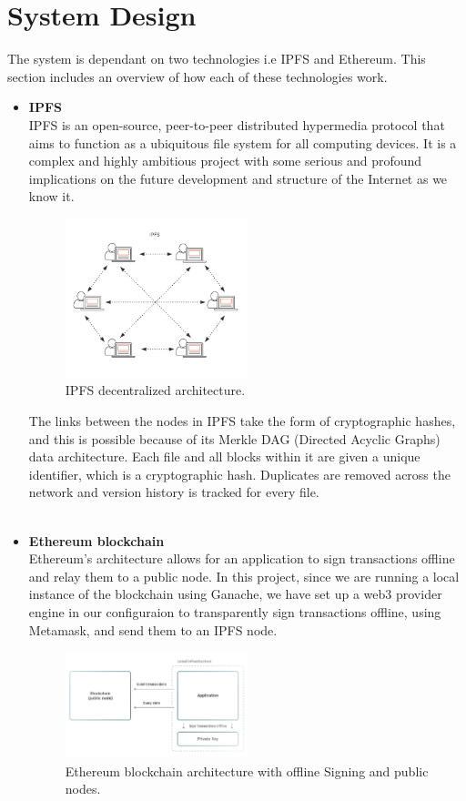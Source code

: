 \section{System Design}
The system is dependant on two technologies i.e IPFS and Ethereum. This section includes an overview of how each of these technologies work.
\begin{itemize}
\item\textbf{IPFS}\\
IPFS is an open-source, peer-to-peer distributed hypermedia protocol that aims to function as a ubiquitous file system for all computing devices. It is a complex and highly ambitious project with some serious and profound implications on the future development and structure of the Internet as we know it.\\
\begin{figure}[H]
  \caption{IPFS decentralized architecture.}
  \centering
  \includegraphics[width=0.5\textwidth]{images/IPFS.png}
\end{figure}
The links between the nodes in IPFS take the form of cryptographic hashes, and this is possible because of its Merkle DAG\cite{art18} (Directed Acyclic Graphs) data architecture. Each file and all blocks within it are given a unique identifier, which is a cryptographic hash. Duplicates are removed across the network and version history is tracked for every file.\\\\
\item\textbf{Ethereum blockchain}\\
Ethereum's architecture allows for an application to sign transactions offline and relay them to a public node. In this project, since we are running a local instance of the blockchain using Ganache, we have set up a web3 provider engine in our configuraion to transparently sign transactions offline, using Metamask, and send them to an IPFS node.
\begin{figure}[H]
  \caption{Ethereum blockchain architecture with offline Signing and public nodes.}
  \centering
  \includegraphics[scale=0.5, width=0.5\textwidth]{images/OfflineBlockchainarch.png}
\end{figure}
\end{itemize}

